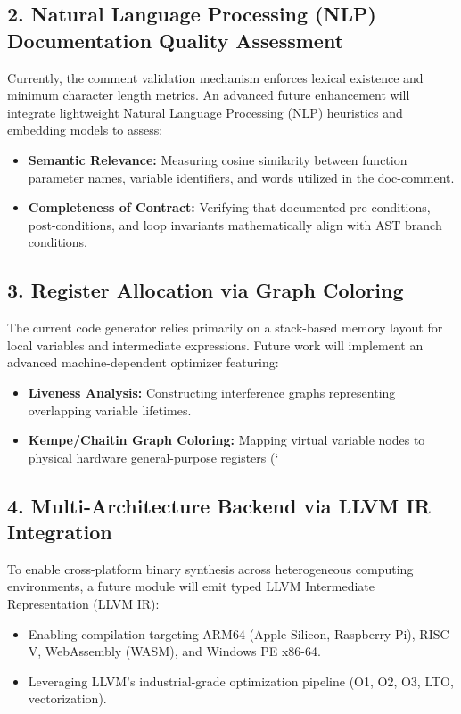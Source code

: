 \subsection{2. Natural Language Processing (NLP) Documentation Quality Assessment}
Currently, the comment validation mechanism enforces lexical existence and minimum character length metrics. An advanced future enhancement will integrate lightweight Natural Language Processing (NLP) heuristics and embedding models to assess:
\begin{itemize}
    \item \textbf{Semantic Relevance:} Measuring cosine similarity between function parameter names, variable identifiers, and words utilized in the doc-comment.
    \item \textbf{Completeness of Contract:} Verifying that documented pre-conditions, post-conditions, and loop invariants mathematically align with AST branch conditions.
\end{itemize}

\subsection{3. Register Allocation via Graph Coloring}
The current code generator relies primarily on a stack-based memory layout for local variables and intermediate expressions. Future work will implement an advanced machine-dependent optimizer featuring:
\begin{itemize}
    \item \textbf{Liveness Analysis:} Constructing interference graphs representing overlapping variable lifetimes.
    \item \textbf{Kempe/Chaitin Graph Coloring:} Mapping virtual variable nodes to physical hardware general-purpose registers (`%
\end{itemize}

\subsection{4. Multi-Architecture Backend via LLVM IR Integration}
To enable cross-platform binary synthesis across heterogeneous computing environments, a future module will emit typed LLVM Intermediate Representation (LLVM IR):
\begin{itemize}
    \item Enabling compilation targeting ARM64 (Apple Silicon, Raspberry Pi), RISC-V, WebAssembly (WASM), and Windows PE x86-64.
    \item Leveraging LLVM's industrial-grade optimization pipeline (O1, O2, O3, LTO, vectorization).
\end{itemize}

